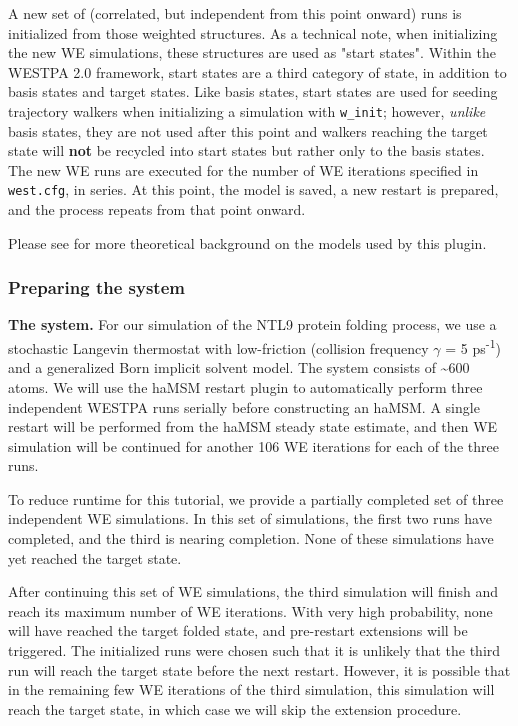 A new set of (correlated, but independent from this point onward) runs is initialized from those weighted structures. 
As a technical note, when initializing the new WE simulations, these structures are used as "start states". 
Within the WESTPA 2.0 framework, start states are a third category of state, in addition to basis states and target states. 
Like basis states, start states are used for seeding trajectory walkers when initializing a simulation with \verb|w_init|; however, \textit{unlike} basis states, they are not used after this point and walkers reaching the target state will \textbf{not} be recycled into start states but rather only to the basis states. 
The new WE runs are executed for the number of WE iterations specified in \verb|west.cfg|, in series. 
At this point, the model is saved, a new restart is prepared, and the process repeats from that point onward.

Please see \citep{russo_westpa_2022, copperman_accelerated_2020} for more theoretical background on the models used by this plugin.

\subsubsection{Preparing the system}

\noindent\textbf{The system.} For our simulation of the NTL9 protein folding process, we use a stochastic Langevin thermostat with low-friction (collision frequency $\gamma$ = 5 ps\textsuperscript{-1}) and a generalized Born implicit solvent model. 
The system consists of \textasciitilde600 atoms. 
We will use the haMSM restart plugin to automatically perform three independent WESTPA runs serially before constructing an haMSM. 
A single restart will be performed from the haMSM steady state estimate, and then WE simulation will be continued for another 106 WE iterations for each of the three runs.

To reduce runtime for this tutorial, we provide a partially completed set of three independent WE simulations. 
In this set of simulations, the first two runs have completed, and the third is nearing completion. 
None of these simulations have yet reached the target state. 

After continuing this set of WE simulations, the third simulation will finish and reach its maximum number of WE iterations. 
With very high probability, none will have reached the target folded state, and pre-restart extensions will be triggered. 
The initialized runs were chosen such that it is unlikely that the third run will reach the target state before the next restart. 
However, it is possible that in the remaining few WE iterations of the third simulation, this simulation will reach the target state, in which case we will skip the extension procedure.

